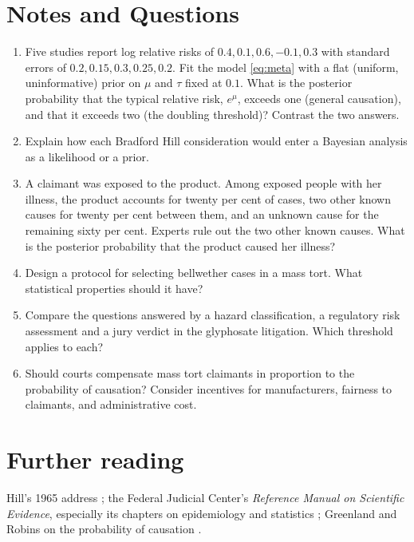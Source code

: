 \section*{Notes and Questions}
\begin{enumerate}[label=\arabic*.]
\item Five studies report log relative risks of $0.4, 0.1, 0.6, -0.1, 0.3$ with standard errors of $0.2, 0.15, 0.3, 0.25, 0.2$. Fit the model \eqref{eq:meta} with a flat (uniform, uninformative) prior on $\mu$ and $\tau$ fixed at $0.1$. What is the posterior probability that the typical relative risk, $e^{\mu}$, exceeds one (general causation), and that it exceeds two (the doubling threshold)? Contrast the two answers.
\item Explain how each Bradford Hill consideration would enter a Bayesian analysis as a likelihood or a prior.
\item A claimant was exposed to the product. Among exposed people with her illness, the product accounts for twenty per cent of cases, two other known causes for twenty per cent between them, and an unknown cause for the remaining sixty per cent. Experts rule out the two other known causes. What is the posterior probability that the product caused her illness?
\item Design a protocol for selecting bellwether cases in a mass tort. What statistical properties should it have?
\item Compare the questions answered by a hazard classification, a regulatory risk assessment and a jury verdict in the glyphosate litigation. Which threshold applies to each?
\item Should courts compensate mass tort claimants in proportion to the probability of causation? Consider incentives for manufacturers, fairness to claimants, and administrative cost.
\end{enumerate}

\section*{Further reading}
Hill's 1965 address \citep{hill1965}; the Federal Judicial Center's \emph{Reference Manual on Scientific Evidence}, especially its chapters on epidemiology and statistics \citep{fjc2011}; Greenland and Robins on the probability of causation \citep{greenland1999}.
